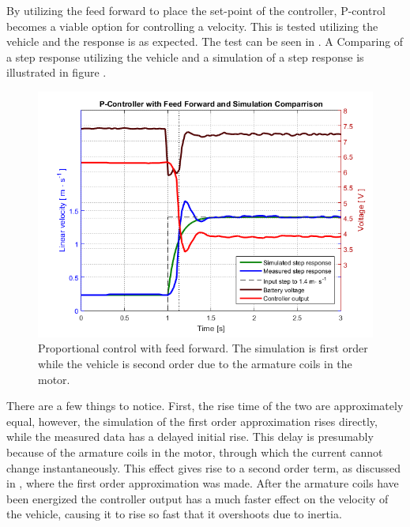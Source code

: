 By utilizing the feed forward to place the set-point of the controller, P-control becomes a viable option for controlling a velocity. This is tested utilizing the vehicle and the response is as expected. The test can be seen in . A Comparing of a step response utilizing the vehicle and a simulation of a step response is illustrated in figure .
%
\begin{figure}[H]
 	\centering
 	\includegraphics[width=.9\textwidth]{figures/stepPfeedForward}
 	\caption{Proportional control with feed forward. The simulation is first order while the vehicle is second order due to the armature coils in the motor.}
 	\label{fig:stepPfeedForward}
\end{figure}
%
There are a few things to notice. First, the rise time of the two are approximately equal, however, the simulation of the first order approximation rises directly, while the measured data has a delayed initial rise. This delay is presumably because of the armature coils in the motor, through which the current cannot change instantaneously. This effect gives rise to a second order term, as discussed in , where the first order approximation was made. After the armature coils have been energized the controller output has a much faster effect on the velocity of the vehicle, causing it to rise so fast that it overshoots due to inertia.

